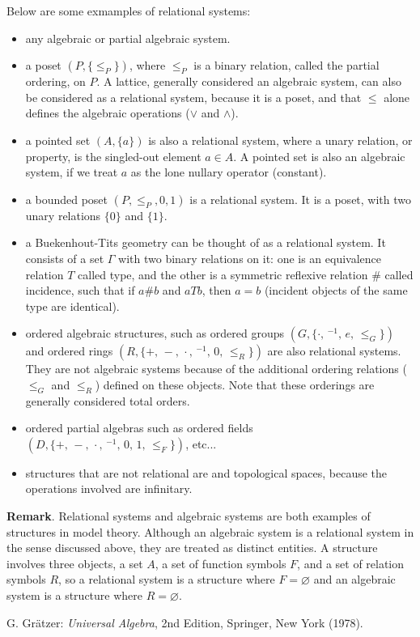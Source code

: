 \documentclass[12pt]{article}
\begin{document}
Below are some exmamples of relational systems:
\begin{itemize}
\item any algebraic or partial algebraic system.
\item a poset $(P,\lbrace \le_P\rbrace)$, where $\le_P$ is a binary relation, called the partial ordering, on $P$.  A lattice, generally considered an algebraic system, can also be considered as a relational system, because it is a poset, and that $\le$ alone defines the algebraic operations ($\vee$ and $\wedge$).
\item a pointed set $(A,\lbrace a\rbrace)$ is also a relational system, where a unary relation, or property, is the singled-out element $a\in A$.  A pointed set is also an algebraic system, if we treat $a$ as the lone nullary operator (constant).
\item a bounded poset $(P,\le_P,0,1)$ is a relational system.  It is a poset, with two unary relations $\lbrace 0\rbrace$ and $\lbrace 1\rbrace$.
\item a Buekenhout-Tits geometry can be thought of as a relational system.  It consists of a set $\Gamma$ with two binary relations on it: one is an equivalence relation $T$ called type, and the other is a symmetric reflexive relation $\#$ called incidence, such that if $a\#b$ and $aTb$, then $a=b$ (incident objects of the same type are identical).
\item ordered algebraic structures, such as ordered groups $(G,\lbrace \cdot\mbox{, }^{-1}\mbox{, }e\mbox{, }\le_G\rbrace)$ and ordered rings $(R,\lbrace +\mbox{, }-\mbox{, }\cdot\mbox{, }^{-1}\mbox{, }0\mbox{, }\le_R\rbrace)$ are also relational systems.  They are not algebraic systems because of the additional ordering relations ($\le_G$ and $\le_R$) defined on these objects.  Note that these orderings are generally considered total orders.
\item ordered partial algebras such as ordered fields $(D,\lbrace +\mbox{, }-\mbox{, }\cdot\mbox{, }^{-1}\mbox{, }0\mbox{, }1\mbox{, }\le_F\rbrace)$, etc...  
\item structures that are not relational are  and topological spaces, because the operations involved are infinitary.
\end{itemize}

\textbf{Remark}.  Relational systems and algebraic systems are both examples of structures in model theory.  Although an algebraic system is a relational system in the sense discussed above, they are treated as distinct entities.   A structure involves three objects, a set $A$, a set of function symbols $F$, and a set of relation symbols $R$, so a relational system is a structure where $F=\varnothing$ and an algebraic system is a structure where $R=\varnothing$.

\begin{thebibliography}{7}
 G. Gr\"{a}tzer: {\em Universal Algebra}, 2nd Edition, Springer, New York (1978).
\end{thebibliography}
\end{document}
